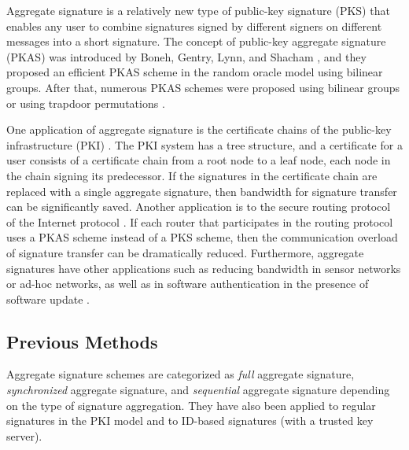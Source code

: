 \documentclass[11pt,letterpaper]{article}
\begin{document}
Aggregate signature is a relatively new type of public-key signature (PKS)
that enables any user to combine  signatures signed by  different
signers on  different messages into a short signature. The concept of
public-key aggregate signature (PKAS) was introduced by Boneh, Gentry, Lynn,
and Shacham \cite{BonehGLS03}, and they proposed an efficient PKAS scheme in
the random oracle model using bilinear groups. After that, numerous PKAS
schemes were proposed using bilinear groups \cite{GentryR06,LuOSSW06,
LuOSSW13,BoldyrevaGOY07,BoldyrevaGOY10,AhnGH10,GerbushLOW12} or using
trapdoor permutations \cite{LysyanskayaMRS04,BellareNN07,Neven08}.

One application of aggregate signature is the certificate chains of the
public-key infrastructure (PKI) \cite{BonehGLS03}. The PKI system has a tree
structure, and a certificate for a user consists of a certificate chain from
a root node to a leaf node, each node in the chain signing its predecessor.
If the signatures in the certificate chain are replaced with a single
aggregate signature, then bandwidth for signature transfer can be
significantly saved. Another application is to the secure routing protocol of
the Internet protocol \cite{BonehGLS03}. If each router that participates in
the routing protocol uses a PKAS scheme instead of a PKS scheme, then the
communication overload of signature transfer can be dramatically reduced.
Furthermore, aggregate signatures have other applications such as reducing
bandwidth in sensor networks or ad-hoc networks, as well as in software
authentication in the presence of software update \cite{AhnGH10}.

\subsection{Previous Methods}

Aggregate signature schemes are categorized as {\it full} aggregate
signature, {\it synchronized} aggregate signature, and {\it sequential}
aggregate signature depending on the type of signature aggregation. They have
also been applied to regular signatures in the PKI model and to ID-based
signatures (with a trusted key server).
\end{document}
